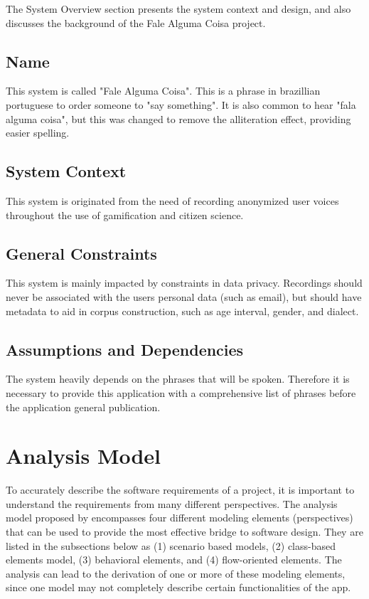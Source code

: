 The System Overview section presents the system context and design, and also discusses the background of the Fale Alguma Coisa project.

\subsection{Name}

This system is called "Fale Alguma Coisa". This is a phrase in brazillian portuguese to order someone to "say something". It is also common to hear "fala alguma coisa", but this was changed to remove the alliteration effect, providing easier spelling.

\subsection{System Context}

This system is originated from the need of recording anonymized user voices throughout the use of gamification and citizen science.

\subsection{General Constraints}

This system is mainly impacted by constraints in data privacy. Recordings should never be associated with the users personal data (such as email), but should have metadata to aid in corpus construction, such as age interval, gender, and dialect.

\subsection{Assumptions and Dependencies}

The system heavily depends on the phrases that will be spoken. Therefore it is necessary to provide this application with a comprehensive list of phrases before the application general publication.

\section{Analysis Model}

To accurately describe the software requirements of a project, it is important to understand the requirements from many different perspectives. The analysis model proposed by \cite{pressman2014software} encompasses four different modeling elements (perspectives) that can be used to provide the most effective bridge to software design. They are listed in the subsections below as (1) scenario based models, (2) class-based elements model, (3) behavioral elements, and (4) flow-oriented elements. The analysis can lead to the derivation of one or more of these modeling elements, since one model may not completely describe certain functionalities of the app.

